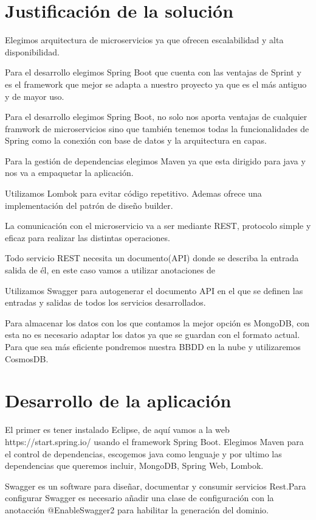 \documentclass[12pt]{report} %
\begin{document}
	
	\section{Justificación de la solución}
	
	
	Elegimos arquitectura de microservicios ya que ofrecen escalabilidad y alta disponibilidad.
	
	Para el desarrollo elegimos Spring Boot que cuenta con las ventajas de Sprint y es el framework que mejor se adapta a nuestro proyecto ya que es el más antiguo y de mayor uso.
	
	Para el desarrollo elegimos Spring Boot, no solo nos aporta ventajas de cualquier framwork de microservicios sino que también tenemos todas la funcionalidades de Spring como la conexión con base de datos y la arquitectura en capas.
	
	Para la gestión de dependencias elegimos Maven ya que esta dirigido para java y nos va a empaquetar la aplicación.
	
	Utilizamos Lombok para evitar código repetitivo. Ademas ofrece una implementación del patrón de diseño builder.
	
	La comunicación con el microservicio va a ser mediante REST, protocolo simple y eficaz para realizar las distintas operaciones.
	
	Todo servicio REST necesita un documento(API) donde se describa la entrada salida de él, en este caso vamos a utilizar anotaciones de 
	
	Utilizamos Swagger para autogenerar el documento API en el que se definen las entradas y salidas de todos los servicios desarrollados.
	
	Para almacenar los datos con los que contamos la mejor opción es MongoDB, con esta no es necesario adaptar los datos ya que se guardan con el formato actual. Para que sea más eficiente pondremos nuestra BBDD en la nube y utilizaremos CosmosDB.
	
	
	\section{Desarrollo de la aplicación}
	El primer es tener instalado Eclipse, de aquí vamos a la web https://start.spring.io/ usando el framework Spring Boot. Elegimos Maven para el control de dependencias, escogemos java como lenguaje y por ultimo las dependencias que queremos incluir, MongoDB, Spring Web, Lombok.
	
	Swagger es un software para diseñar, documentar y consumir servicios Rest.Para configurar Swagger es necesario añadir una clase de configuración con la anotacción @EnableSwagger2 para habilitar la generación del dominio.
	
\end{document}
